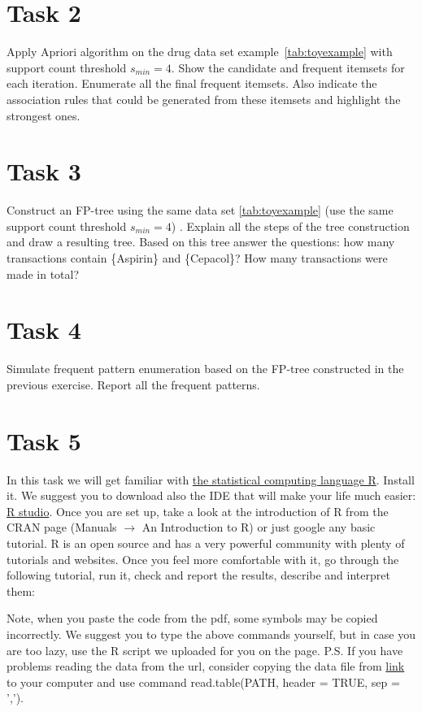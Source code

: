 \documentclass{article}
\begin{document}
\section*{Task 2}
Apply Apriori algorithm on the drug data set example~\ref{tab:toyexample} with support count threshold $s_{min} = 4$. Show the candidate and frequent itemsets for each iteration. Enumerate all the final frequent itemsets. Also indicate the association rules that could be generated from these itemsets and highlight the strongest ones.
\section*{Task 3}
Construct an FP-tree using the same data set \ref{tab:toyexample} (use the same support count  threshold $s_{min} = 4$) . Explain all the steps of the tree construction and draw a resulting tree. Based on this tree answer the questions: how many transactions contain \{Aspirin\} and \{Cepacol\}? How many transactions were made in total?


\section*{Task 4}
Simulate frequent pattern enumeration based on the FP-tree constructed in the previous exercise. Report all the frequent patterns.
 
\section*{Task 5}
In this task we will get familiar with \href{http://www.r-project.org/}{the statistical computing language R}. Install it. We suggest you to download also the IDE that will make your life much easier: \href{https://www.rstudio.com/}{R studio}. Once you are set up, take a look at the introduction of R from the CRAN page (Manuals $\rightarrow$ An Introduction to R) or just google any basic tutorial. R is an open source and has a very powerful community with plenty of tutorials and websites. Once you feel more comfortable with it, go through the following tutorial, run it, check and report the results, describe and interpret them:

Note, when you paste the code from the pdf, some symbols may be copied incorrectly. We suggest you to type the above commands yourself, but in case you are too lazy, use the R script we uploaded for you on the page. P.S. If you have problems reading the data from the url, consider copying the data file from \href{https://courses.cs.ut.ee/MTAT.03.183/2014_spring/uploads/Main/titanic.txt}{link} to your computer and use command read.table(PATH, header = TRUE, sep = ','). 
\end{document}
